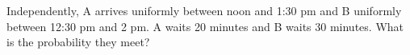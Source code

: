 Independently, A arrives uniformly between noon and 1:30 pm and B uniformly between 12:30 pm and 2 pm. A waits 20 minutes and B waits 30 minutes. What is the probability they meet?
